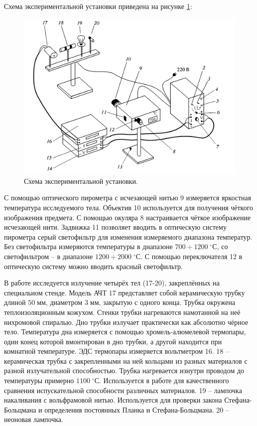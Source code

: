 \documentclass[10pt,a4paper]{article}
\newcommand{\mm}{\; мм}
\newcommand{\cels}{\; ^\circ С}
\begin{document}
\begin{multicols}{2}
	Схема экспериментальной установки приведена на рисунке \ref{img:exp_scheme}:
	\begin{figure}[H]
		\centering
		\includegraphics[width=1\textwidth]{images/exp_scheme.png}
		\caption{Схема экспериментальной установки.}
		\label{img:exp_scheme}
	\end{figure}
	
	С помощью оптического пирометра с исчезающей нитью 9 измеряется яркостная температура исследуемого тела. Объектив 10 используется для получения чёткого изображения предмета. С помощью окуляра 8 настраивается чёткое изображение исчезающей нити. Задвижка 11 позволяет вводить в оптическую систему пирометра серый светофильтр для изменения измеряемого диапазона температур. Без светофильтра измеряются температуры в диапазоне $700 \div 1200 \cels$, со светофильтром -- в диапазоне $1200 \div 2000 \cels$. С помощью переключателя 12 в оптическую систему можно вводить красный светофильтр.
	
	В работе исследуется излучение четырёх тел (17-20), закреплённых на специальном стенде. Модель АЧТ 17 представляет собой керамическую трубку длиной $50 \mm$, диаметром $3 \mm$, закрытую с одного конца. Трубка окружена теплоизоляционным кожухом. Стенки трубки нагреваются намотанной на неё нихромовой спиралью. Дно трубки излучает практически как абсолютно чёрное тело. Температура дна измеряется с помощью хромель-алюмелевой термопары, один конец которой вмонтирован в дно трубки, а другой находится при комнатной температуре. ЭДС термопары измеряется вольтметром 16. 18 -- керамическая трубка с закрепленными на ней кольцами из разных материалов с разной излучательной способностью. Трубка нагревается изнутри проводом до температуры примерно $1100 \cels$. Используется в работе для качественного сравнения испускательной способности различных материалов. 19 -- лампочка накаливания с вольфрамовой нитью. Используется для проверки закона Стефана-Больцмана и определения постоянных Планка и Стефана-Больцмана. 20 -- неоновая лампочка.
	

\end{multicols}
\end{document}
